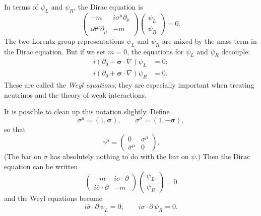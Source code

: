In terms of $\psi_L$ and $\psi_R$, the Dirac equation is
\begin{equation}
  \begin{pmatrix}
    -m & i\sigma^\mu\partial_\mu\\
    i\bar{\sigma}^\mu\partial_\mu & -m
  \end{pmatrix}
  \begin{pmatrix}\psi_L\\ \psi_R\end{pmatrix} = 0 .
  \label{eq:3.41}
\end{equation}
The two Lorentz group representations $\psi_L$ and $\psi_R$ are mixed by the
mass term in the Dirac equation.  But if we set $m=0$, the equations for
$\psi_L$ and $\psi_R$ decouple:
\begin{align}
  i(\partial_0 - \bm{\sigma}\cdot\nabla)\psi_L &= 0;\\
  i(\partial_0 + \bm{\sigma}\cdot\nabla)\psi_R &= 0 .
  \label{eq:3.42}
\end{align}
These are called the \emph{Weyl equations}; they are especially important
when treating neutrinos and the theory of weak interactions.

It is possible to clean up this notation slightly.  Define
\begin{equation}
  \sigma^\mu = (1, \bm{\sigma}),\qquad
  \bar{\sigma}^\mu = (1, -\bm{\sigma}),
  \label{eq:3.43}
\end{equation}
so that
\begin{equation}
  \gamma^\mu = \begin{pmatrix}
    0 & \sigma^\mu\\
    \bar{\sigma}^\mu & 0
  \end{pmatrix}.
  \label{eq:3.44}
\end{equation}
(The bar on $\sigma$ has absolutely nothing to do with the bar on $\psi$.)
Then the Dirac equation can be written
\begin{equation}
  \begin{pmatrix}
    -m & i\sigma\cdot\partial\\
    i\bar{\sigma}\cdot\partial & -m
  \end{pmatrix}
  \begin{pmatrix}\psi_L\\ \psi_R\end{pmatrix} = 0
  \label{eq:3.45}
\end{equation}
and the Weyl equations become
\begin{equation}
  i\bar{\sigma}\cdot\partial\,\psi_L = 0;\qquad
  i\sigma\cdot\partial\,\psi_R = 0 .
  \label{eq:3.46}
\end{equation}

